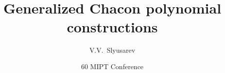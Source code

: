 

\title[Chacon polynomials] %
{Generalized Chacon polynomial constructions}


\author%
{V.V.~Slyusarev}


\date[ 25.11.2017] %
{\normalsize 60 MIPT Conference}

\subject{MIPT-60}


